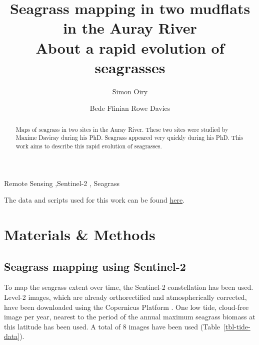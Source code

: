 \documentclass[
  number]{elsarticle}
\begin{document}
\begin{frontmatter}
\title{Seagrass mapping in two mudflats in the Auray
River \\\large{About a rapid evolution of seagrasses} }
\author[1]{Simon Oiry%
%
}
\author[1]{Bede Ffinian Rowe Davies%
%
}




        
\begin{abstract}
Maps of seagrass in two sites in the Auray River. These two sites were
studied by Maxime Daviray during his PhD. Seagrass appeared very quickly
during his PhD. This work aims to describe this rapid evolution of
seagrasses.
\end{abstract}





\begin{keyword}
    Remote Sensing \sep Sentinel-2 \sep 
    Seagrass
\end{keyword}
\end{frontmatter}
    
The data and scripts used for this work can be found
\href{https://github.com/SigOiry/Seagrass_maps_Maxime}{here}.

\section{Materials \& Methods}\label{materials-methods}

\subsection{Seagrass mapping using
Sentinel-2}\label{seagrass-mapping-using-sentinel-2}

To map the seagrass extent over time, the Sentinel-2 constellation has
been used. Level-2 images, which are already orthorectified and
atmospherically corrected, have been downloaded using the Copernicus
Platform \citep{Copernicus_Sentinel}. One low tide, cloud-free image per
year, nearest to the period of the annual maximum seagrass biomass at
this latitude has been used. A total of 8 images have been used
(Table~\ref{tbl-tide-data}).
\end{document}
